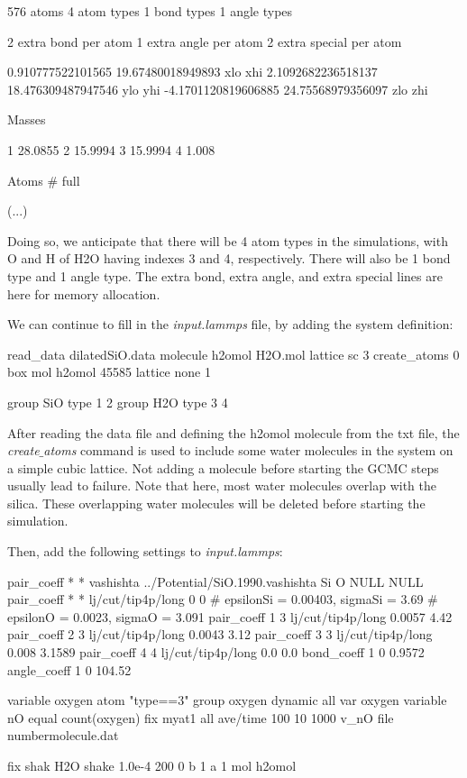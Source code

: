 \begin{lcverbatim}
576 atoms
4 atom types
1 bond types
1 angle types

2 extra bond per atom
1 extra angle per atom
2 extra special per atom

0.910777522101565 19.67480018949893 xlo xhi
2.1092682236518137 18.476309487947546 ylo yhi
-4.1701120819606885 24.75568979356097 zlo zhi

Masses

1 28.0855
2 15.9994
3 15.9994
4 1.008

Atoms # full

(...)
\end{lcverbatim}

\noindent Doing so, we anticipate that there will be 4 atom types in
the simulations, with O and H of H2O having indexes 3 and 4,
respectively. There will also be 1 bond type and 1 angle
type. The extra bond, extra angle, and extra special lines
are here for memory allocation. 

\vspace{0.25cm} \noindent We can continue to fill in the
\textit{input.lammps} file, by adding the system definition:

\begin{lcverbatim}
read_data dilatedSiO.data
molecule h2omol H2O.mol
lattice sc 3
create_atoms 0 box mol h2omol 45585
lattice none 1

group SiO type 1 2
group H2O type 3 4
\end{lcverbatim}

\noindent After reading the data file and defining the h2omol molecule
from the txt file, the \textit{create$\_$atoms} command is used to
include some water molecules in the system on a 
simple cubic lattice. Not adding a molecule before starting the
GCMC steps usually lead to failure. Note that here,
most water molecules overlap with the silica. These 
overlapping water molecules will be deleted before 
starting the simulation. 

\vspace{0.25cm} \noindent Then, add the following settings to \textit{input.lammps}:

\begin{lcverbatim}
pair_coeff * * vashishta ../Potential/SiO.1990.vashishta Si O NULL NULL
pair_coeff * * lj/cut/tip4p/long 0 0
# epsilonSi = 0.00403, sigmaSi = 3.69
# epsilonO = 0.0023, sigmaO = 3.091
pair_coeff 1 3 lj/cut/tip4p/long 0.0057 4.42
pair_coeff 2 3 lj/cut/tip4p/long 0.0043 3.12
pair_coeff 3 3 lj/cut/tip4p/long 0.008 3.1589
pair_coeff 4 4 lj/cut/tip4p/long 0.0 0.0
bond_coeff 1 0 0.9572
angle_coeff 1 0 104.52

variable oxygen atom "type==3"
group oxygen dynamic all var oxygen
variable nO equal count(oxygen)
fix myat1 all ave/time 100 10 1000 v_nO file numbermolecule.dat

fix shak H2O shake 1.0e-4 200 0 b 1 a 1 mol h2omol
\end{lcverbatim}

